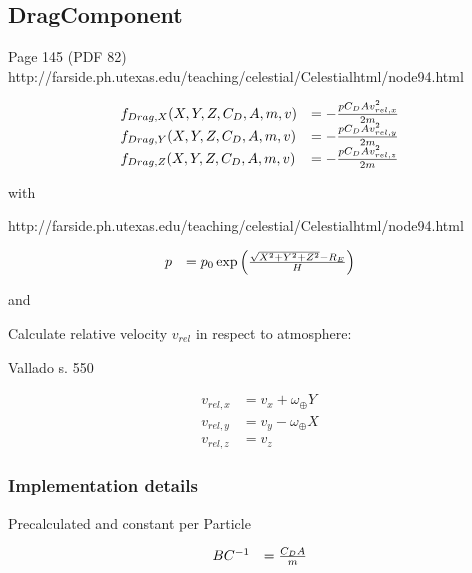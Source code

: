 \documentclass{article}
\begin{document}
\subsection{DragComponent}
Page 145 (PDF 82) http://farside.ph.utexas.edu/teaching/celestial/Celestialhtml/node94.html

\begin{equation}
\begin{array}{ll}
f_{Drag,X}(X,Y,Z,C_D,A,m,v) &= -{{pC_DAv_{rel,x}^2} \over {2m}} \\
f_{Drag,Y}(X,Y,Z,C_D,A,m,v) &= -{{pC_DAv_{rel,y}^2} \over {2m}} \\
f_{Drag,Z}(X,Y,Z,C_D,A,m,v) &= -{{pC_DAv_{rel,z}^2} \over {2m}}
\end{array}
\end{equation}

with

http://farside.ph.utexas.edu/teaching/celestial/Celestialhtml/node94.html

\begin{equation}
\begin{array}{ll}
p &= p_0\exp\left({\sqrt{X^2+Y^2+Z^2} - R_E} \over H\right)
\end{array}
\end{equation}

and

Calculate relative velocity \(v_{rel}\) in respect to atmosphere:


Vallado s. 550

\begin{equation}
\begin{array}{ll}
v_{rel,x} &= v_x + \omega_{\oplus}Y \\
v_{rel,y} &= v_y - \omega_{\oplus}X \\
v_{rel,z} &= v_z
\end{array}
\end{equation}

\subsubsection{Implementation details}

Precalculated and constant per Particle

\begin{equation}
\begin{array}{ll}
BC^{-1} &={C_DA \over m}
\end{array}
\end{equation}
\end{document}
